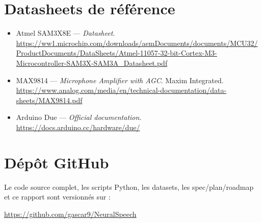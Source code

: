 
\section{Datasheets de référence}

\begin{itemize}
    \item Atmel SAM3X8E --- \emph{Datasheet}. \url{https://ww1.microchip.com/downloads/aemDocuments/documents/MCU32/ProductDocuments/DataSheets/Atmel-11057-32-bit-Cortex-M3-Microcontroller-SAM3X-SAM3A_Datasheet.pdf}
    \item MAX9814 --- \emph{Microphone Amplifier with AGC}. Maxim Integrated. \url{https://www.analog.com/media/en/technical-documentation/data-sheets/MAX9814.pdf}
    \item Arduino Due --- \emph{Official documentation}. \url{https://docs.arduino.cc/hardware/due/}
\end{itemize}

\section{Dépôt GitHub}

Le code source complet, les scripts Python, les datasets, les spec/plan/roadmap et ce rapport sont versionnés sur :
\begin{center}
\url{https://github.com/gascar9/NeuralSpeech}
\end{center}
